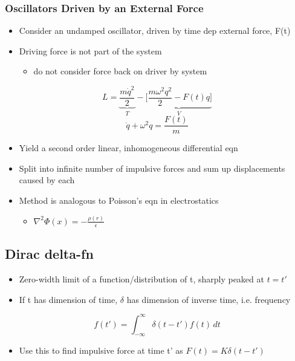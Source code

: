 \documentclass[a4paper,11pt,normalem]{article}
\begin{document}
\subsubsection{Oscillators Driven by an External Force}\label{oscillators-driven-by-an-external-force}

\begin{itemize}
\item
  Consider an undamped oscillator, driven by time dep external force,
  F(t)
\item
  Driving force is not part of the system
  \begin{itemize}
  \item
    do not consider force back on driver by system
  \end{itemize}
\end{itemize}

\[
    L = \underbrace{\frac{m\dot{q}^2}{2}}_{T} - \underbrace{\Bigg[\frac{m\omega^{2}q^2}{2} - F(t)q \Bigg]}_{V}
\] \[
    \ddot{q} + \omega^2 q = \frac{F(t)}{m}
\]

\begin{itemize}
\item
  Yield a second order linear, inhomogeneous differential eqn
\item
  Split into infinite number of impulsive forces and sum up
  displacements caused by each
\item
  Method is analogous to Poisson's eqn in electrostatics
  \begin{itemize}
  \item
    \(\nabla^{2}\Phi(x) = -\frac{\rho(r)}{\epsilon}\)
  \end{itemize}
\end{itemize}

\subsection{Dirac delta-fn}\label{dirac-delta-fn}

\begin{itemize}
\item
  Zero-width limit of a function/distribution of t, sharply peaked at
  \(t = t'\)
\item
  If t has dimension of time, \(\delta\) has dimension of inverse time,
  i.e. frequency
\end{itemize}

\[
    f(t') = \int_{-\infty}^{\infty} \delta(t - t')f(t)\,dt
\]

\begin{itemize}
\item
  Use this to find impulsive force at time t' as
  \(F(t) = K\delta(t - t')\)
\end{itemize}
\end{document}
